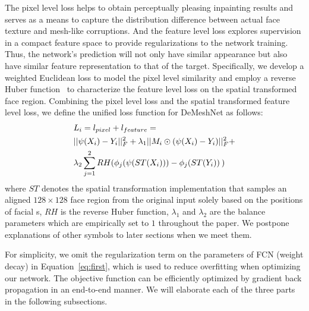 \documentclass[10pt,twocolumn,letterpaper]{article}
\begin{document}
The pixel level loss helps to obtain perceptually pleasing inpainting results and serves as a means to capture the distribution difference between actual face texture and mesh-like corruptions. And the feature level loss explores supervision in a compact feature space to provide regularizations to the network training. Thus, the network's prediction will not only have similar appearance but also have similar feature representation to that of the target. Specifically, we develop a weighted Euclidean loss to model the pixel level similarity and employ a reverse Huber function~\cite{laina2016deeper} to characterize the feature level loss on the spatial transformed face region. Combining the pixel level loss and the spatial transformed feature level loss, we define the unified loss function for DeMeshNet as follows:
\begin{equation}
\begin{split}
&{L_i} = l_{pixel} + {l_{feature}} = \\
&||\psi ({X_i} ) - {Y_i}||_F^2 + \lambda_1 ||{M_i} \odot (\psi ({X_i} ) - {Y_i})||_F^2+\\
 &\lambda_2\sum\limits_{j=1}^2 {RH({\phi _j}(\psi ({ST(X_i)})) - {\phi _j}({ST(Y_i)})} {\kern 1pt} {\kern 1pt} )
\end{split}\label{eq:first}
\end{equation}
where $ST$ denotes the spatial transformation implementation that samples an aligned $128\times 128$ face region from the original input solely based on the positions of facial
s, $RH$ is the reverse Huber function, $\lambda_1$ and $\lambda_2$ are the balance parameters which are empirically set to $1$ throughout the paper. We postpone explanations of other symbols to later sections when we meet them.

For simplicity, we omit the regularization term on the parameters of FCN (weight decay) in Equation~\ref{eq:first}, which is used to reduce overfitting when optimizing our network. The objective function can be efficiently optimized by gradient back propagation in an end-to-end manner. We will elaborate each of the three parts in the following subsections.


\end{document}
